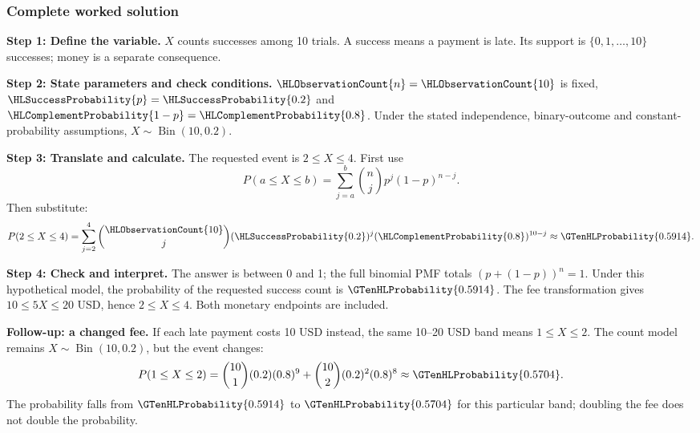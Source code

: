 \subsubsection*{Complete worked solution}\label{sol:fees}
\par\noindent\begin{minipage}{\linewidth}
\textbf{Step 1: Define the variable.} $X$ counts successes among 10 trials. A success means a payment is late. Its support is $\{0,1,\ldots,10\}$ successes; money is a separate consequence.
\end{minipage}\par\medskip
\par\noindent\begin{minipage}{\linewidth}
\textbf{Step 2: State parameters and check conditions.} $\HLObservationCount{n}=\HLObservationCount{10}$ is fixed, $\HLSuccessProbability{p}=\HLSuccessProbability{0.2}$ and $\HLComplementProbability{1-p}=\HLComplementProbability{0.8}$. Under the stated independence, binary-outcome and constant-probability assumptions, $X\sim\operatorname{Bin}(10,0.2)$.
\end{minipage}\par\medskip
\par\noindent\begin{minipage}{\linewidth}
\textbf{Step 3: Translate and calculate.} The requested event is $ 2\leq X\leq4$. First use
\[P(a\leq X\leq b)=\sum_{j=a}^{b}\binom nj p^j(1-p)^{n-j}.\]
Then substitute:
\[P(2\leq X\leq4)=\sum_{j=2}^{4}\binom{\HLObservationCount{10}}j(\HLSuccessProbability{0.2})^j(\HLComplementProbability{0.8})^{10-j}\approx \GTenHLProbability{0.5914}.\]
\end{minipage}\par\medskip
\par\noindent\begin{minipage}{\linewidth}
\textbf{Step 4: Check and interpret.} The answer is between 0 and 1; the full binomial PMF totals $(p+(1-p))^n=1$. Under this hypothetical model, the probability of the requested success count is $\GTenHLProbability{0.5914}$. The fee transformation gives $10\leq5X\leq20$ USD, hence $2\leq X\leq4$. Both monetary endpoints are included.

\textbf{Follow-up: a changed fee.} If each late payment costs 10 USD instead, the same 10--20 USD band means $1\leq X\leq2$. The count model remains $X\sim\operatorname{Bin}(10,0.2)$, but the event changes:
\[P(1\leq X\leq2)=\binom{10}{1}(0.2)(0.8)^9+\binom{10}{2}(0.2)^2(0.8)^8\approx \GTenHLProbability{0.5704}.\]
The probability falls from $\GTenHLProbability{0.5914}$ to $\GTenHLProbability{0.5704}$ for this particular band; doubling the fee does not double the probability.
\end{minipage}\par\medskip


